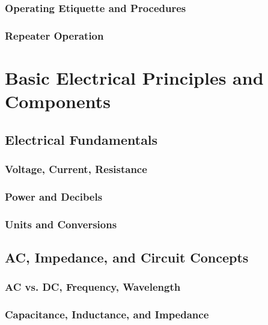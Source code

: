 \documentclass[12pt]{book}
\begin{document}
\section{Operating Etiquette and Procedures}

\section{Repeater Operation}


\part{Basic Electrical Principles and Components}
\chapter{Electrical Fundamentals}
\section{Voltage, Current, Resistance}


\section{Power and Decibels}

\section{Units and Conversions}

\chapter{AC, Impedance, and Circuit Concepts}
\section{AC vs. DC, Frequency, Wavelength}


\section{Capacitance, Inductance, and Impedance}





\end{document}
